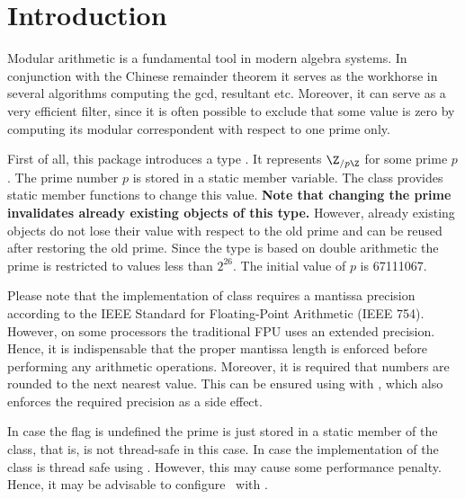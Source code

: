\cleardoublepage
{}



\section{Introduction}

Modular arithmetic is a fundamental tool in modern algebra systems. 
In conjunction with the Chinese remainder theorem it serves as the 
workhorse in several algorithms computing the gcd, resultant etc. 
Moreover, it can serve as a very efficient filter, since it is often 
possible to exclude that some value is zero by computing its modular 
correspondent with respect to one prime only. 

First of all, this package introduces a type .
It represents $\Z_{/p\Z}$ for some prime $p$. 
The prime number $p$ is stored in a static member variable. 
The class provides static member functions to change this value. 
{\bf Note that changing the prime invalidates already existing objects 
of this type.}
However, already existing objects do not lose their value with respect to the 
old prime and can be reused after restoring the old prime. 
Since the type is based on double 
arithmetic the prime is restricted to values less than $2^{26}$. 
The initial value of $p$ is 67111067. 

Please note that the implementation of class  requires a mantissa 
precision according to the IEEE Standard for Floating-Point Arithmetic (IEEE 754). 
However, on some processors the traditional FPU uses an extended precision. Hence, it 
is  indispensable that the proper mantissa length is enforced before performing 
any arithmetic operations. Moreover, it is required that numbers are rounded to the 
next nearest value. This can be ensured using  with 
, which also enforces the required precision as a side effect. 

\begin{ccAdvanced}      
In case the flag  
is undefined the prime is just stored in a static member 
of the class, that is,  is not thread-safe in this case.  
In case 
the implementation of the class is thread safe using 
. However, this may cause some performance 
penalty. Hence, it may be advisable to configure \cgal\ with 
. 
\end{ccAdvanced} 

